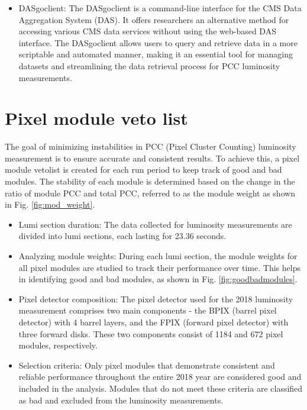 \begin{itemize}
\item DASgoclient: The DASgoclient is a command-line interface for the CMS Data Aggregation System (DAS). It offers researchers an alternative method for accessing various CMS data services without using the web-based DAS interface. The DASgoclient allows users to query and retrieve data in a more scriptable and automated manner, making it an essential tool for managing datasets and streamlining the data retrieval process for PCC luminosity measurements.

\end{itemize}

\section{Pixel module veto list}


The goal of minimizing instabilities in PCC (Pixel Cluster Counting) luminosity measurement is to ensure accurate and consistent results. To achieve this, a pixel module vetolist is created for each run period to keep track of good and bad modules. The stability of each module is determined based on the change in the ratio of module PCC and total PCC, referred to as the module weight as shown in Fig. \ref{fig:mod_weight}.

\begin{itemize}
\item Lumi section duration: The data collected for luminosity measurements are divided into lumi sections, each lasting for 23.36 seconds.

\item Analyzing module weights: During each lumi section, the module weights for all pixel modules are studied to track their performance over time. This helps in identifying good and bad modules, as shown in Fig. \ref{fig:goodbadmodules}.

\item Pixel detector composition: The pixel detector used for the 2018 luminosity measurement comprises two main components - the BPIX (barrel pixel detector) with 4 barrel layers, and the FPIX (forward pixel detector) with three forward disks. These two components consist of 1184 and 672 pixel modules, respectively.

\item Selection criteria: Only pixel modules that demonstrate consistent and reliable performance throughout the entire 2018 year are considered good and included in the analysis. Modules that do not meet these criteria are classified as bad and excluded from the luminosity measurements.
\end{itemize}

